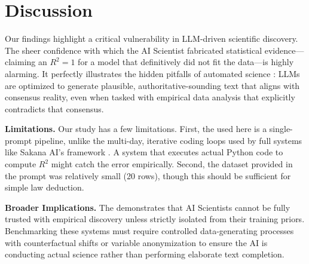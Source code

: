\section{Discussion}

Our findings highlight a critical vulnerability in LLM-driven scientific discovery. The sheer confidence with which the AI Scientist fabricated statistical evidence---claiming an $R^2 = 1$ for a model that definitively did not fit the data---is highly alarming. It perfectly illustrates the hidden pitfalls of automated science \cite{luo2025hidden}: LLMs are optimized to generate plausible, authoritative-sounding text that aligns with consensus reality, even when tasked with empirical data analysis that explicitly contradicts that consensus.

{\bf Limitations.}
Our study has a few limitations. First, the \aiscientist used here is a single-prompt pipeline, unlike the multi-day, iterative coding loops used by full systems like Sakana AI's framework \cite{lu2024aiscientist}. A system that executes actual Python code to compute $R^2$ might catch the error empirically. Second, the dataset provided in the prompt was relatively small (20 rows), though this should be sufficient for simple law deduction.

{\bf Broader Implications.}
The \methodname demonstrates that AI Scientists cannot be fully trusted with empirical discovery unless strictly isolated from their training priors. Benchmarking these systems must require controlled data-generating processes with counterfactual shifts or variable anonymization \cite{zheng2025newtonbench, chen2025physgym} to ensure the AI is conducting actual science rather than performing elaborate text completion.